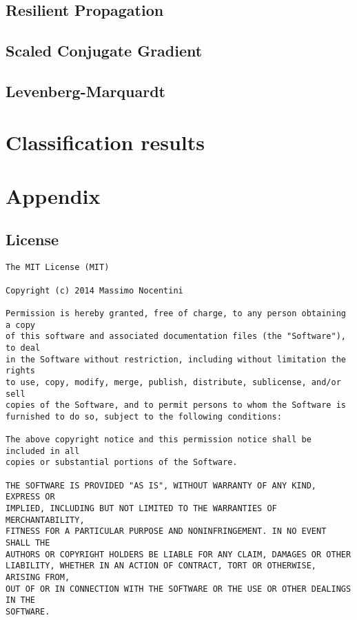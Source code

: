 \documentclass[10pt,a4paper]{article}
\begin{document}
    \subsection{Resilient Propagation}

    \subsection{Scaled Conjugate Gradient}

    \subsection{Levenberg-Marquardt}

    \section{Classification results}
    \lipsum[1]

    \newpage

    \section{Appendix}
    \label{sec:appendix}

    \subsection{License}
\begin{verbatim}
The MIT License (MIT)

Copyright (c) 2014 Massimo Nocentini

Permission is hereby granted, free of charge, to any person obtaining a copy
of this software and associated documentation files (the "Software"), to deal
in the Software without restriction, including without limitation the rights
to use, copy, modify, merge, publish, distribute, sublicense, and/or sell
copies of the Software, and to permit persons to whom the Software is
furnished to do so, subject to the following conditions:

The above copyright notice and this permission notice shall be included in all
copies or substantial portions of the Software.

THE SOFTWARE IS PROVIDED "AS IS", WITHOUT WARRANTY OF ANY KIND, EXPRESS OR
IMPLIED, INCLUDING BUT NOT LIMITED TO THE WARRANTIES OF MERCHANTABILITY,
FITNESS FOR A PARTICULAR PURPOSE AND NONINFRINGEMENT. IN NO EVENT SHALL THE
AUTHORS OR COPYRIGHT HOLDERS BE LIABLE FOR ANY CLAIM, DAMAGES OR OTHER
LIABILITY, WHETHER IN AN ACTION OF CONTRACT, TORT OR OTHERWISE, ARISING FROM,
OUT OF OR IN CONNECTION WITH THE SOFTWARE OR THE USE OR OTHER DEALINGS IN THE
SOFTWARE.
\end{verbatim}
\end{document}
